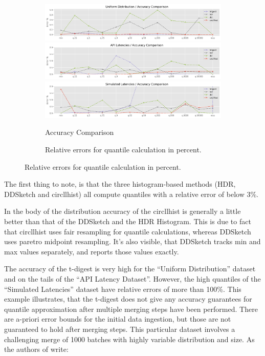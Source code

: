 \documentclass{article}
\theoremstyle{plain}
\theoremstyle{remark}
\begin{document}
\begin{figure}
  \begin{subfigure}{\textwidth}
    \includegraphics[width=\textwidth]{evaluation/images/accuracy_line_Uniform_Distribution.png}
    \includegraphics[width=\textwidth]{evaluation/images/accuracy_line_API_Latencies.png}
    \includegraphics[width=\textwidth]{evaluation/images/accuracy_line_Simulated_Latencies.png}
    \caption{Accuracy Comparison}
    \label{fig:acc}
  \end{subfigure}
  \begin{subfigure}{\textwidth}
    \begin{minipage}{\textwidth}
      \scriptsize
      
    \end{minipage}
    \caption{Relative errors for quantile calculation in percent.}
    \label{tab:acc}
  \end{subfigure}
\end{figure}

The first thing to note, is that the three histogram-based methods (HDR, DDSketch and circllhist)
all compute quantiles with a relative error of below 3\%.

In the body of the distribution accuracy of the circllhist is generally a little better than that of
the DDSketch and the HDR Histogram.  This is due to fact that circllhist uses fair resampling for
quantile calculations, whereas DDSketch uses paretro midpoint resampling.  It's also visible, that
DDSketch tracks min and max values separately, and reports those values exactly.

The accuracy of the t-digest is very high for the ``Uniform Distribution'' dataset and on the tails
of the ``API Latency Dataset''. However, the high quantiles of the ``Simulated Latencies'' dataset
have relative errors of more than 100\%. This example illustrates, that the t-digest does not give
any accuracy guarantees for quantile approximation after multiple merging steps have been performed.
There are a-priori error bounds for the initial data ingestion, but those are not guaranteed to hold
after merging steps. This particular dataset involves a challenging merge of 1000 batches with
highly variable distribution and size. As the authors of \cite{tdigest} write:
\end{document}
